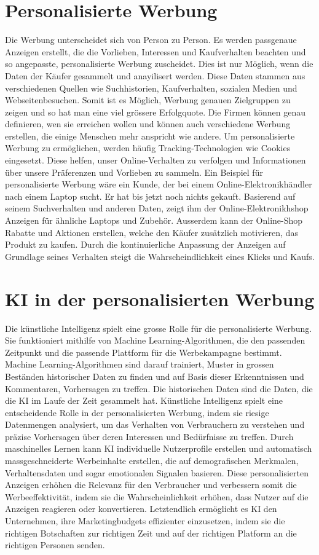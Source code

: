 \documentclass{article}
\begin{document}
\section{Personalisierte Werbung}
 Die Werbung unterscheidet sich von Person zu Person. Es werden passgenaue Anzeigen erstellt, die die Vorlieben, Interessen und Kaufverhalten beachten und so angepasste, personalisierte Werbung zuscheidet. Dies ist nur Möglich, wenn die Daten der Käufer gesammelt und anayilisert werden. Diese Daten stammen aus verschiedenen Quellen wie Suchhistorien, Kaufverhalten, sozialen Medien und Webseitenbesuchen. Somit ist es Möglich, Werbung genauen Zielgruppen zu zeigen und so hat man eine viel grössere Erfolgquote. Die Firmen können genau definieren, wen sie erreichen wollen und können auch verschiedene Werbung erstellen, die einige Menschen mehr anspricht wie andere. Um personalisierte Werbung zu ermöglichen, werden häufig Tracking-Technologien wie Cookies eingesetzt. Diese helfen, unser Online-Verhalten zu verfolgen und Informationen über unsere Präferenzen und Vorlieben zu sammeln. Ein Beispiel für personalisierte Werbung wäre ein Kunde, der bei einem Online-Elektronikhändler nach einem Laptop sucht. Er hat bis jetzt noch nichts gekauft. Basierend auf seinem Suchverhalten und anderen Daten, zeigt ihm der Online-Elektronikhshop Anzeigen für ähnliche Laptops und Zubehör. Ausserdem kann der Online-Shop Rabatte und Aktionen erstellen, welche den Käufer zusätzlich motivieren, das Produkt zu kaufen. Durch die kontinuierliche Anpassung der Anzeigen auf Grundlage seines Verhalten steigt die Wahrscheindlichkeit eines Klicks und Kaufs.

 \section{KI in der personalisierten Werbung}

 Die künstliche Intelligenz spielt eine grosse Rolle für die personalisierte Werbung. Sie funktioniert mithilfe von Machine Learning-Algorithmen, die den passenden Zeitpunkt und die passende Plattform für die Werbekampagne bestimmt. Machine Learning-Algorithmen sind darauf trainiert, Muster in grossen Beständen historischer Daten zu finden und auf Basis dieser Erkenntnissen und Kommentaren, Vorhersagen zu treffen. Die historischen Daten sind die Daten, die die KI im Laufe der Zeit gesammelt hat.
 Künstliche Intelligenz spielt eine entscheidende Rolle in der personalisierten Werbung, indem sie riesige Datenmengen analysiert, um das Verhalten von Verbrauchern zu verstehen und präzise Vorhersagen über deren Interessen und Bedürfnisse zu treffen. Durch maschinelles Lernen kann KI individuelle Nutzerprofile erstellen und automatisch massgeschneiderte Werbeinhalte erstellen, die auf demografischen Merkmalen, Verhaltensdaten und sogar emotionalen Signalen basieren. Diese personalisierten Anzeigen erhöhen die Relevanz für den Verbraucher und verbessern somit die Werbeeffektivität, indem sie die Wahrscheinlichkeit erhöhen, dass Nutzer auf die Anzeigen reagieren oder konvertieren. Letztendlich ermöglicht es KI den Unternehmen, ihre Marketingbudgets effizienter einzusetzen, indem sie die richtigen Botschaften zur richtigen Zeit und auf der richtigen Platform an die richtigen Personen senden.
\end{document}
